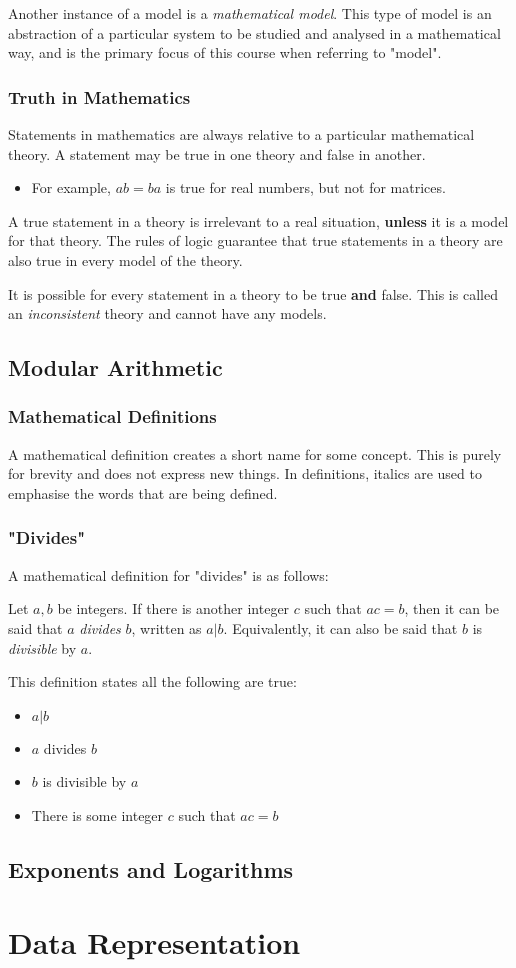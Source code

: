 \documentclass{article}
\begin{document}
Another instance of a model is a \emph{mathematical model}. 
This type of model is an abstraction of a particular system to be studied and analysed in a mathematical way,
and is the primary focus of this course when referring to "model".
%
\subsubsection{Truth in Mathematics}
Statements in mathematics are always relative to a particular mathematical theory.
A statement may be true in one theory and false in another.
\begin{itemize}
    \item For example, \(ab = ba\) is true for real numbers, but not for matrices.
\end{itemize}
A true statement in a theory is irrelevant to a real situation, \textbf{unless} it is a model for that theory.
The rules of logic guarantee that true statements in a theory are also true in every model of the theory.
\begin{notebox}
    It is possible for every statement in a theory to be true \textbf{and} false.
    This is called an \emph{inconsistent} theory and cannot have any models.
\end{notebox}

\subsection{Modular Arithmetic}
\subsubsection{Mathematical Definitions}
A mathematical definition creates a short name for some concept.
This is purely for brevity and does not express new things.
In definitions, italics are used to emphasise the words that are being defined.
\subsubsection{"Divides"}
A mathematical definition for "divides" is as follows:
\begin{tcolorbox}
    Let \(a, b\) be integers.
    If there is another integer \(c\) such that \(ac = b\),
    then it can be said that \(a\) \emph{divides} \(b\),
    written as \(a \vert b\).
    Equivalently, it can also be said that  \(b\) is \emph{divisible} by \(a\).
\end{tcolorbox}
This definition states all the following are true:
\begin{itemize}
    \item \(a \vert b\)
    \item \(a\) divides \(b\)
    \item \(b\) is divisible by \(a\)
    \item There is some integer \(c\) such that \(ac = b\)
\end{itemize}

\subsection{Exponents and Logarithms}

\section{Data Representation}
\end{document}
